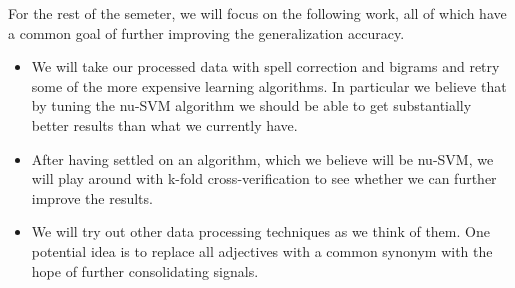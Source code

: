 For the rest of the semeter, we will focus on the following work,
all of which have a common goal of further improving the generalization
accuracy.
\begin{itemize}
\item We will take our processed data with spell correction and bigrams
and retry some of the more expensive learning algorithms. In particular
we believe that by tuning the nu-SVM algorithm we should be able to
get substantially better results than what we currently have.
\item After having settled on an algorithm, which we believe will be nu-SVM,
we will play around with k-fold cross-verification to see whether
we can further improve the results.
\item We will try out other data processing techniques as we think of them.
One potential idea is to replace all adjectives with a common synonym
with the hope of further consolidating signals.\end{itemize}


